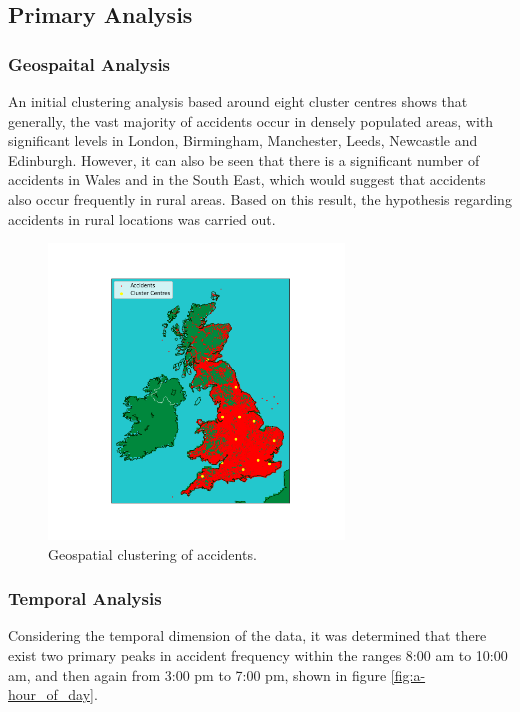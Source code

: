 \documentclass[12pt]{article}
\begin{document}
\subsection{Primary Analysis}

\subsubsection{Geospaital Analysis}

An initial clustering analysis based around eight cluster centres shows that generally, the vast majority of accidents occur in densely populated areas, with significant levels in London, Birmingham, Manchester, Leeds, Newcastle and Edinburgh. However, it can also be seen that there is a significant number of accidents in Wales and in the South East, which would suggest that accidents also occur frequently in rural areas. Based on this result, the hypothesis regarding accidents in rural locations was carried out.

\begin{figure}[ht]
\centering     %
\includegraphics[width=0.70\textwidth]{accident_clusters}
\caption{Geospatial clustering of accidents.}
\end{figure}

\newpage

\subsubsection{Temporal Analysis}

Considering the temporal dimension of the data, it was determined that there exist two primary peaks in accident frequency within the ranges 8:00 am to 10:00 am, and then again from 3:00 pm to 7:00 pm, shown in figure \ref{fig:a-hour_of_day}.
\end{document}
